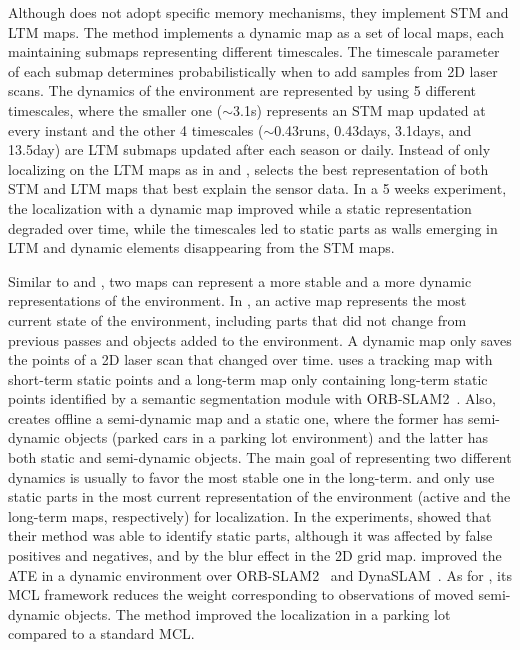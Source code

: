 Although \cite{biber-duckett:2009:0278364908096286} does not adopt specific memory mechanisms, they implement STM and LTM maps. The method implements a dynamic map as a set of local maps, each maintaining submaps representing different timescales. The timescale parameter of each submap determines probabilistically when to add samples from 2D laser scans.
The dynamics of the environment are represented by using 5 different timescales, where the smaller one ($\sim$3.1s) represents an STM map updated at every instant and the other 4 timescales ($\sim$0.43runs, 0.43days, 3.1days, and 13.5day) are LTM submaps updated after each season or daily. Instead of only localizing on the LTM maps as in\cite{dayoub-et-al:2011:013} and \cite{bacca-et-al:2013:003}, \cite{biber-duckett:2009:0278364908096286} selects the best representation of both STM and LTM maps that best explain the sensor data.
In a 5 weeks experiment, the localization with a dynamic map improved while a static representation degraded over time, while the timescales led to static parts as walls emerging in LTM and dynamic elements disappearing from the STM maps.

Similar to \cite{dayoub-et-al:2011:013} and \cite{bacca-et-al:2013:003}, two maps can represent a more stable and a more dynamic representations of the environment.
In \cite{walcott-bryant-et-al:2012:6385561}, an active map represents the most current state of the environment, including parts that did not change from previous passes and objects added to the environment. A dynamic map only saves the points of a 2D laser scan that changed over time.
\cite{wang-et-al:2019:8793499} uses a tracking map with short-term static points and a long-term map only containing long-term static points identified by a semantic segmentation module with ORB-SLAM2~\parencite{discussion:orb-slam2}.
Also, \cite{zhu-et-al:2021:9561584} creates offline a semi-dynamic map and a static one, where the former has semi-dynamic objects (parked cars in a parking lot environment) and the latter has both static and semi-dynamic objects.
The main goal of representing two different dynamics is usually to favor the most stable one in the long-term.
\cite{walcott-bryant-et-al:2012:6385561} and \cite{wang-et-al:2019:8793499} only use static parts in the most current representation of the environment (active and the long-term maps, respectively) for localization.
In the experiments, \cite{walcott-bryant-et-al:2012:6385561} showed that their method was able to identify static parts, although it was affected by false positives and negatives, and by the blur effect in the 2D grid map.
\cite{wang-et-al:2019:8793499} improved the ATE in a dynamic environment over ORB-SLAM2~\parencite{discussion:orb-slam2} and DynaSLAM~\parencite{bescos-et-al:2018:2860039}.
As for \cite{zhu-et-al:2021:9561584}, its MCL framework reduces the weight corresponding to observations of moved semi-dynamic objects. The method improved the localization in a parking lot compared to a standard MCL.



